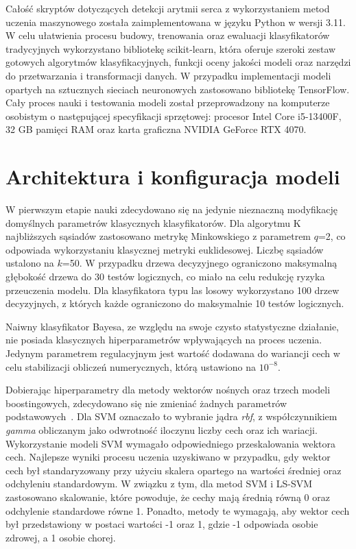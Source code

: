 \documentclass[a4paper,twoside,12pt]{book}
\begin{document}
Całość skryptów dotyczących detekcji arytmii serca z wykorzystaniem metod uczenia maszynowego została zaimplementowana w języku Python w wersji 3.11. W celu ułatwienia procesu budowy, trenowania oraz ewaluacji klasyfikatorów tradycyjnych wykorzystano bibliotekę scikit-learn, która oferuje szeroki zestaw gotowych algorytmów klasyfikacyjnych, funkcji oceny jakości modeli oraz narzędzi do przetwarzania i transformacji danych. W przypadku implementacji modeli opartych na sztucznych sieciach neuronowych zastosowano bibliotekę TensorFlow.\\

Cały proces nauki i testowania modeli został przeprowadzony na komputerze osobistym o następującej specyfikacji sprzętowej: procesor Intel Core i5-13400F, 32 GB pamięci RAM oraz karta graficzna NVIDIA GeForce RTX 4070.
\section{Architektura i konfiguracja modeli}
W pierwszym etapie nauki zdecydowano się na jedynie nieznaczną modyfikację domyślnych parametrów klasycznych klasyfikatorów. Dla algorytmu K najbliższych sąsiadów zastosowano metrykę Minkowskiego z parametrem $q$=2, co odpowiada wykorzystaniu klasycznej metryki euklidesowej. Liczbę sąsiadów ustalono na $k$=50. W przypadku drzewa decyzyjnego ograniczono maksymalną głębokość drzewa do 30 testów logicznych, co miało na celu redukcję ryzyka przeuczenia modelu. Dla klasyfikatora typu las losowy wykorzystano 100 drzew decyzyjnych, z których każde ograniczono do maksymalnie 10 testów logicznych.

Naiwny klasyfikator Bayesa, ze względu na swoje czysto statystyczne działanie, nie posiada klasycznych hiperparametrów wpływających na proces uczenia. Jedynym parametrem regulacyjnym jest wartość dodawana do wariancji cech w celu stabilizacji obliczeń numerycznych, którą ustawiono na $10^{-8}$.


Dobierając hiperparametry dla metody wektorów nośnych oraz trzech modeli boostingowych, zdecydowano się nie zmieniać żadnych parametrów podstawowych~\cite{Harrison2023, CatBoostDocs2025, LightGBMdocs2025}. Dla SVM oznaczało to wybranie jądra \textit{rbf}, z współczynnikiem \textit{gamma} obliczanym jako odwrotność iloczynu liczby cech oraz ich wariacji. Wykorzystanie modeli SVM wymagało odpowiedniego przeskalowania wektora cech. Najlepsze wyniki procesu uczenia uzyskiwano w przypadku, gdy wektor cech był standaryzowany przy użyciu skalera opartego na wartości średniej oraz odchyleniu standardowym. W związku z tym, dla metod SVM i LS-SVM zastosowano skalowanie, które powoduje, że cechy mają średnią równą 0 oraz odchylenie standardowe równe 1. Ponadto, metody te wymagają, aby wektor cech był przedstawiony w postaci wartości -1 oraz 1, gdzie -1 odpowiada osobie zdrowej, a 1 osobie chorej.\\
\end{document}
